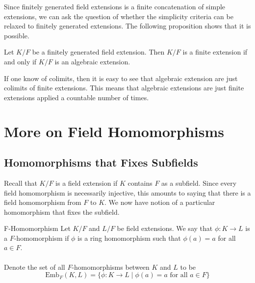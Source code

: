 \documentclass[a4paper]{article}
\begin{document}
Since finitely generated field extensions is a finite concatenation of simple extensions, we can ask the question of whether the simplicity criteria can be relaxed to finitely generated extensions. The following proposition shows that it is possible. 

\begin{prp}{}{} Let $K/F$ be a finitely generated field extension. Then $K/F$ is a finite extension if and only if $K/F$ is an algebraic extension. 
\end{prp}

If one know of colimits, then it is easy to see that algebraic extension are just colimits of finite extensions. This means that algebraic extensions are just finite extensions applied a countable number of times. 

\pagebreak
\section{More on Field Homomorphisms}
\subsection{Homomorphisms that Fixes Subfields}
Recall that $K/F$ is a field extension if $K$ contains $F$ as a subfield. Since every field homomorphism is necessarily injective, this amounts to saying that there is a field homomorphism from $F$ to $K$. We now have notion of a particular homomorphism that fixes the subfield. 

\begin{defn}{F-Homomorphism}{} Let $K/F$ and $L/F$ be field extensions. We say that $\phi:K\to L$ is a $F$-homomorphism if $\phi$ is a ring homomorphism such that $\phi(a)=a$ for all $a\in F$. \\~\\
Denote the set of all $F$-homomorphisms between $K$ and $L$ to be $$\text{Emb}_F(K,L)=\{\phi:K\to L\;|\;\phi(a)=a\text{ for all }a\in F\}$$
\end{defn}
\end{document}
